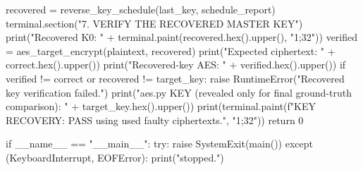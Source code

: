 \begin{lightcode}[numbers=left,firstnumber=1]
    recovered = reverse_key_schedule(last_key, schedule_report)
    terminal.section("7. VERIFY THE RECOVERED MASTER KEY")
    print("Recovered K0: " + terminal.paint(recovered.hex().upper(), "1;32"))
    verified = aes_target_encrypt(plaintext, recovered)
    print("Expected ciphertext: " + correct.hex().upper())
    print("Recovered-key AES:   " + verified.hex().upper())
    if verified != correct or recovered != target_key:
        raise RuntimeError("Recovered key verification failed.")
    print("aes.py KEY (revealed only for final ground-truth comparison): " + target_key.hex().upper())
    print(terminal.paint(f"KEY RECOVERY: PASS using {used} faulty ciphertexts.", "1;32"))
    return 0


if __name__ == "__main__":
    try:
        raise SystemExit(main())
    except (KeyboardInterrupt, EOFError):
        print("\nLesson stopped.")
\end{lightcode}
